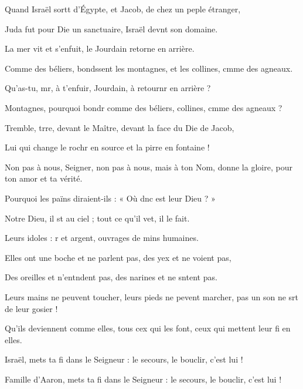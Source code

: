 \item Quand Israël sortt d’Égypte,\psstar{} et Jacob, de chez un peple étranger,
\item Juda fut pour Die un sanctuaire,\psstar{} Israël devnt son domaine.
\item La mer vit et s’enfuit,\psstar{} le Jourdain retorne en arrière.
\item Comme des béliers, bondssent les montagnes,\psstar{} et les collines, cmme des agneaux.
\item Qu’as-tu, mr, à t’enfuir,\psstar{} Jourdain, à retournr en arrière ?
\item Montagnes, pourquoi bondr comme des béliers,\psstar{} collines, cmme des agneaux ?
\item Tremble, trre, devant le Maître,\psstar{} devant la face du Die de Jacob,
\item Lui qui change le rochr en source\psstar{} et la pirre en fontaine !
\item Non pas à nous, Seigner, non pas à nous,\psstar{} mais à ton Nom, donne la gloire, pour ton amor et ta vérité.
\item Pourquoi les païns diraient-ils :\psstar{} « Où dnc est leur Dieu ? »
\item Notre Dieu, il st au ciel ;\psstar{} tout ce qu’il vet, il le fait.
\item Leurs idoles : r et argent,\psstar{} ouvrages de mins humaines.
\item Elles ont une boche et ne parlent pas,\psstar{} des yex et ne voient pas,
\item Des oreilles et n’entndent pas,\psstar{} des narines et ne sntent pas.
\item Leurs mains ne peuvent toucher,\pscross{} leurs pieds ne pevent marcher,\psstar{} pas un son ne srt de leur gosier !
\item Qu’ils deviennent comme elles, tous cex qui les font,\psstar{} ceux qui mettent leur fi en elles.
\item Israël, mets ta fi dans le Seigneur :\psstar{} le secours, le bouclir, c’est lui !
\item Famille d’Aaron, mets ta fi dans le Seigneur :\psstar{} le secours, le bouclir, c’est lui !

